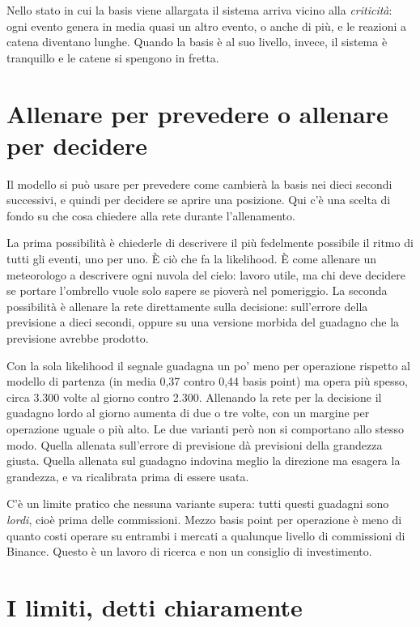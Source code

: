 \documentclass[a4paper,11pt]{article}
\begin{document}
Nello stato in cui la basis viene allargata il sistema arriva vicino alla \emph{criticità}: ogni evento genera in media quasi un altro evento, o anche di più, e le reazioni a catena diventano lunghe. Quando la basis è al suo livello, invece, il sistema è tranquillo e le catene si spengono in fretta.

\section*{Allenare per prevedere o allenare per decidere}

Il modello si può usare per prevedere come cambierà la basis nei dieci secondi successivi, e quindi per decidere se aprire una posizione. Qui c'è una scelta di fondo su che cosa chiedere alla rete durante l'allenamento.

La prima possibilità è chiederle di descrivere il più fedelmente possibile il ritmo di tutti gli eventi, uno per uno. È ciò che fa la likelihood. È come allenare un meteorologo a descrivere ogni nuvola del cielo: lavoro utile, ma chi deve decidere se portare l'ombrello vuole solo sapere se pioverà nel pomeriggio. La seconda possibilità è allenare la rete direttamente sulla decisione: sull'errore della previsione a dieci secondi, oppure su una versione morbida del guadagno che la previsione avrebbe prodotto.

Con la sola likelihood il segnale guadagna un po' meno per operazione rispetto al modello di partenza (in media 0,37 contro 0,44 basis point) ma opera più spesso, circa 3.300 volte al giorno contro 2.300. Allenando la rete per la decisione il guadagno lordo al giorno aumenta di due o tre volte, con un margine per operazione uguale o più alto. Le due varianti però non si comportano allo stesso modo. Quella allenata sull'errore di previsione dà previsioni della grandezza giusta. Quella allenata sul guadagno indovina meglio la direzione ma esagera la grandezza, e va ricalibrata prima di essere usata.

C'è un limite pratico che nessuna variante supera: tutti questi guadagni sono \emph{lordi}, cioè prima delle commissioni. Mezzo basis point per operazione è meno di quanto costi operare su entrambi i mercati a qualunque livello di commissioni di Binance. Questo è un lavoro di ricerca e non un consiglio di investimento.

\section*{I limiti, detti chiaramente}
\end{document}
